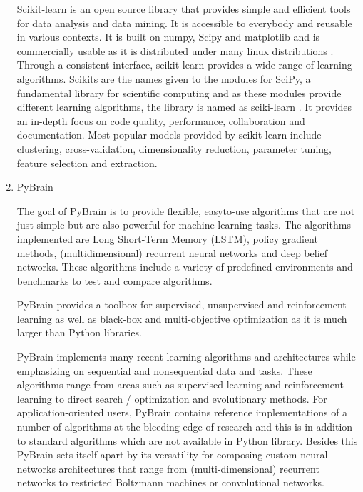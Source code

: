 \begin{enumerate}
Scikit-learn is an open source library that provides simple and
efficient tools for data analysis and data mining. It is
accessible to everybody and reusable in various contexts. It is
built on numpy, Scipy and matplotlib and is commercially usable as
it is distributed under many linux distributions
\label{\detokenize{i524/technologies:id92}}{\hyperref[\detokenize{i524/technologies:scik1}]{\sphinxcrossref{{[}83{]}}}}. Through a consistent interface, scikit-learn
provides a wide range of learning algorithms. Scikits are the
names given to the modules for SciPy, a fundamental library for
scientific computing and as these modules provide different
learning algorithms, the library is named as sciki-learn
\label{\detokenize{i524/technologies:id93}}{\hyperref[\detokenize{i524/technologies:scik2}]{\sphinxcrossref{{[}84{]}}}}. It provides an in-depth focus on code quality,
performance, collaboration and documentation. Most popular models
provided by scikit-learn include clustering, cross-validation,
dimensionality reduction, parameter tuning, feature selection and
extraction.

\item {} 
PyBrain \label{\detokenize{i524/technologies:id94}}{\hyperref[\detokenize{i524/technologies:article-pybrain}]{\sphinxcrossref{{[}85{]}}}}

The goal of PyBrain is to provide flexible, easyto-use algorithms
that are not just simple but are also powerful for machine
learning tasks. The algorithms implemented are Long Short-Term
Memory (LSTM), policy gradient methods, (multidimensional)
recurrent neural networks and deep belief networks. These
algorithms include a variety of predefined environments and
benchmarks to test and compare algorithms.

PyBrain provides a toolbox for supervised, unsupervised and
reinforcement learning as well as black-box and multi-objective
optimization as it is much larger than Python libraries.

PyBrain implements many recent learning algorithms and
architectures while emphasizing on sequential and nonsequential
data and tasks. These algorithms range from areas such as
supervised learning and reinforcement learning to direct search /
optimization and evolutionary methods.  For application-oriented
users, PyBrain contains reference implementations of a number of
algorithms at the bleeding edge of research and this is in
addition to standard algorithms which are not available in Python
library. Besides this PyBrain sets itself apart by its versatility
for composing custom neural networks architectures that range from
(multi-dimensional) recurrent networks to restricted Boltzmann
machines or convolutional networks.


\end{enumerate}
